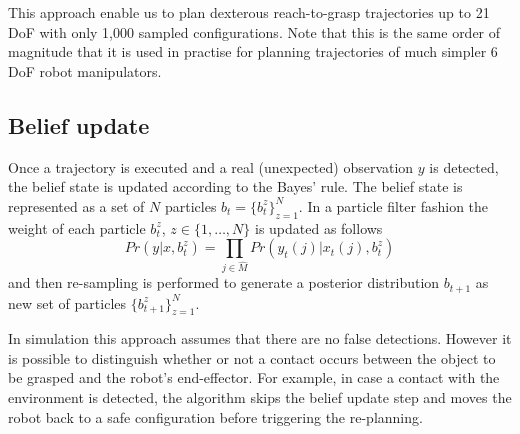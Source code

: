 This approach enable us to plan dexterous reach-to-grasp trajectories up to 21 DoF with only 1,000 sampled configurations. Note that this is the same order of magnitude that it is used in practise for planning trajectories of much simpler 6 DoF robot manipulators. 

\subsection{Belief update}

Once a trajectory is executed and a real (unexpected) observation $y$ is detected, the belief state is updated according to the Bayes' rule. The belief state is represented as a set of $N$ particles $b_t=\{b_t^z\}_{z=1}^{N}$. In a particle filter fashion the weight of each particle $b_t^z$, $z\in\{1,\ldots,N\}$ is updated as follows
$$
Pr(y|x, b_t^z)=\prod_{j\in\hat{M}}{Pr(y_{t}(j)|x_{t}(j),b_t^z)}
$$
and then re-sampling is performed to generate a posterior distribution $b_{t+1}$ as new set of particles $\{b_{t+1}^z\}_{z=1}^{N}$.

In simulation this approach assumes that there are no false detections. However it is possible to distinguish whether or not a contact occurs between the object to be grasped and the robot's end-effector. For example, in case a contact with the environment is detected, the algorithm skips the belief update step and moves the robot back to a safe configuration before triggering the re-planning.

